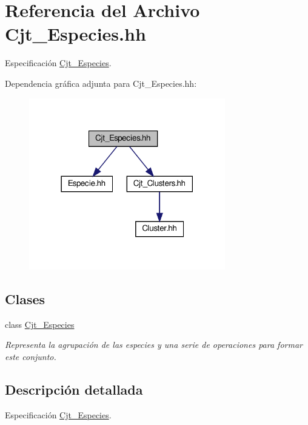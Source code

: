 \hypertarget{_cjt___especies_8hh}{}\section{Referencia del Archivo Cjt\+\_\+\+Especies.\+hh}
\label{_cjt___especies_8hh}


Especificación \hyperlink{class_cjt___especies}{Cjt\+\_\+\+Especies}.  


Dependencia gráfica adjunta para Cjt\+\_\+\+Especies.\+hh\+:
\nopagebreak
\begin{figure}[H]
\begin{center}
\leavevmode
\includegraphics[width=242pt]{_cjt___especies_8hh__incl}
\end{center}
\end{figure}
\subsection*{Clases}
\begin{DoxyCompactItemize}
\item 
class \hyperlink{class_cjt___especies}{Cjt\+\_\+\+Especies}
\begin{DoxyCompactList}\small\item\em Representa la agrupación de las especies y una serie de operaciones para formar este conjunto. \end{DoxyCompactList}\end{DoxyCompactItemize}


\subsection{Descripción detallada}
Especificación \hyperlink{class_cjt___especies}{Cjt\+\_\+\+Especies}. 

